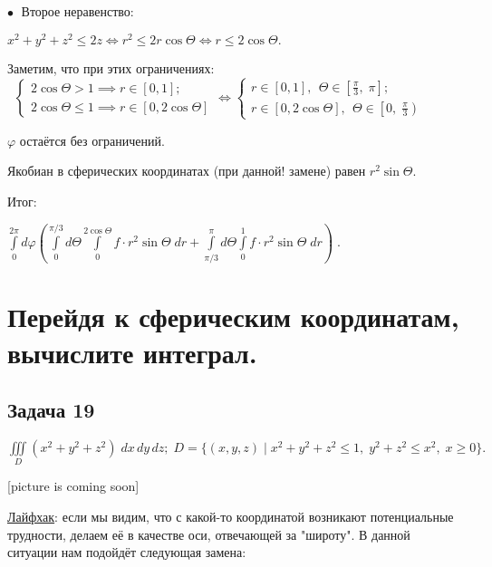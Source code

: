 \documentclass[a4paper, fleqn]{article}
\begin{document}
    $\bullet \; $ Второе неравенство:
    
    $x^2 + y^2 + z^2 \leq 2z \iff r^2 \leq 2 r \cos \Theta \iff r \leq 2 \cos \Theta.$
    
    Заметим, что при этих ограничениях: $\; \; \begin{cases} 
    2 \cos \Theta > 1 \implies r \in [0,1];\\
    2 \cos \Theta \leq 1 \implies r \in [0, 2 \cos \Theta]
    \end{cases} \iff 
    \begin{cases} 
    r \in [0,1], \; \, \Theta \in \left[\frac{\pi}{3}, \; \pi \right];\\
    r \in \left[0, 2 \cos \Theta \right], \; \, \Theta \in \left[0, \; \frac{\pi}{3} \right)
    \end{cases}$
    
    $\varphi$ остаётся без ограничений.
    
    Якобиан в сферических координатах (при данной! замене) равен $r^2 \sin \Theta.$
    
    Итог:
    
    $\boxed{\displaystyle \int\limits_{0 }^{2 \pi} d \varphi\left( 
    \int\limits_{0 }^{\pi/3} d \Theta \int\limits_{0 }^{2 \cos \Theta} f \cdot r^2 \sin \Theta \; dr + 
    \int\limits_{\pi/3 }^{\pi} d \Theta \int\limits_{0 }^{1} f \cdot r^2 \sin \Theta \; dr
    \right) } \; .$
    
    
    
    
    
    \section*{Перейдя к сферическим координатам, вычислите интеграл.}
    
    
    \subsection*{Задача 19}
    
    $\displaystyle \iiint\limits_{D} (x^2 + y^2 + z^2) \; dx \, dy\, dz; \; D = \{(x,y,z) \mid x^2 + y^2 + z^2 \leq 1, \; y^2 + z^2 \leq x^2, \; x \geq 0 \}. $
    
    [picture is coming soon]
    
    \underline{Лайфхак}: если мы видим, что с какой-то координатой возникают потенциальные трудности, делаем её в качестве оси, отвечающей за "широту". В данной ситуации нам подойдёт следующая замена:
    
\end{document}
